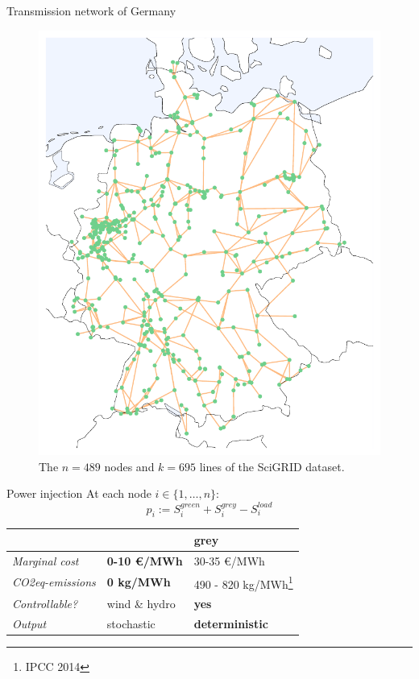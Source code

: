 \documentclass[10pt]{beamer}
\newcommand{\mel}[1]{\ensuremath{{{#1}}}}
\begin{document}
\begin{frame}{Transmission network of Germany}
    \begin{figure}
    \includegraphics[height=.69\paperheight]{img/just_the_network.pdf}
    \caption{The $n=489$ nodes and $k=695$ lines of the SciGRID dataset.}
    \end{figure}
\end{frame}

\begin{frame}{Power injection}
    At each node $i\in\{1,\dots,n\}$:
    \[\mel{p}_i := S^{green}_i + S^{grey}_i - S^{load}_i\]
    \begin{table}[]
\begin{tabular}{l|ll}
\toprule
                         & \color{renewablegreen}{\textbf{green}} & \textbf{\textbf{grey}} \\
                         \midrule
\emph{Marginal cost} & \textbf{0-10 €/MWh}       & 30-35 €/MWh      \\
\emph{CO2eq-emissions} & \textbf{0 kg/MWh}          & 490 - 820 kg/MWh\footnote{IPCC 2014} \\
\emph{Controllable?}   & wind \& hydro               & \textbf{yes}             \\
\emph{Output}          & stochastic       & \textbf{deterministic}\\
\bottomrule
\end{tabular}
\end{table}
\end{frame}
\end{document}
